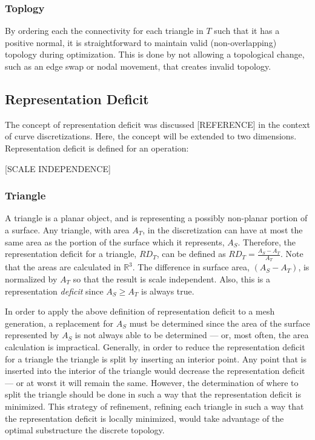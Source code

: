 \subsubsection{Toplogy}
By ordering each the connectivity for each triangle in $T$ such that it
has a positive normal, it is straightforward to maintain valid
(non-overlapping) topology during optimization. This is done by not
allowing a topological change, such as an edge swap or nodal movement,
that creates invalid topology.

\subsection{Representation Deficit}
The concept of representation deficit was discussed [REFERENCE] in the
context of curve discretizations. Here, the concept will be extended to
two dimensions. Representation deficit is defined for an operation:

[SCALE INDEPENDENCE]

\subsubsection{Triangle}
A triangle is a planar object, and is representing a possibly non-planar
portion of a surface. Any triangle, with area $A_T$, in the
discretization can have at most the same area as the portion of the
surface which it represents, $A_S$. Therefore, the representation
deficit for a triangle, $RD_T$, can be defined as $RD_T = \frac{A_S -
A_T}{A_T}$. Note that the areas are calculated in ${\mathbb R}^3$. The
difference in surface area, $\left(A_S - A_T\right)$, is normalized by
$A_T$ so that the result is scale independent. Also, this is a
representation {\it deficit} since $A_S \ge A_T$ is always true.

In order to apply the above definition of representation deficit to a
mesh generation, a replacement for $A_S$ must be determined since the
area of the surface represented by $A_S$ is not always able to be
determined --- or, most often, the area calculation is impractical.
Generally, in order to reduce the representation deficit for a triangle
the triangle is split by inserting an interior point. Any point that is
inserted into the interior of the triangle would decrease the
representation deficit --- or at worst it will remain the same. However,
the determination of where to split the triangle should be done in such
a way that the representation deficit is minimized. This strategy of
refinement, refining each triangle in such a way that the representation
deficit is locally minimized,  would take advantage of the optimal
substructure the discrete topology.

